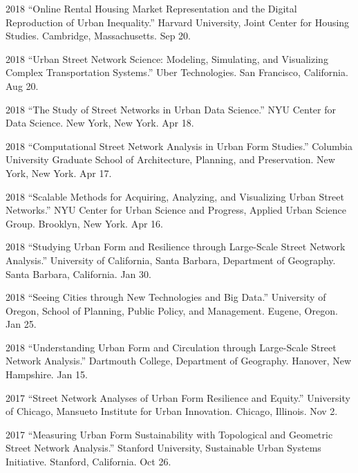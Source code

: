 \documentclass[12pt,letterpaper]{report}
\begin{document}
\begin{tablist}
	
\item[2018] \tab \enquote{Online Rental Housing Market Representation and the Digital Reproduction of Urban Inequality.} Harvard University, Joint Center for Housing Studies. Cambridge, Massachusetts. Sep 20.

\item[2018] \tab \enquote{Urban Street Network Science: Modeling, Simulating, and Visualizing Complex Transportation Systems.} Uber Technologies. San Francisco, California. Aug 20.

\item[2018] \tab \enquote{The Study of Street Networks in Urban Data Science.} NYU Center for Data Science. New York, New York. Apr 18.

\item[2018] \tab \enquote{Computational Street Network Analysis in Urban Form Studies.} Columbia University Graduate School of Architecture, Planning, and Preservation. New York, New York. Apr 17.

\item[2018] \tab \enquote{Scalable Methods for Acquiring, Analyzing, and Visualizing Urban Street Networks.} NYU Center for Urban Science and Progress, Applied Urban Science Group. Brooklyn, New York. Apr 16.

\item[2018] \tab \enquote{Studying Urban Form and Resilience through Large-Scale Street Network Analysis.} University of California, Santa Barbara, Department of Geography. Santa Barbara, California. Jan 30.

\item[2018] \tab \enquote{Seeing Cities through New Technologies and Big Data.} University of Oregon, School of Planning, Public Policy, and Management. Eugene, Oregon. Jan 25.

\item[2018] \tab \enquote{Understanding Urban Form and Circulation through Large-Scale Street Network Analysis.} Dartmouth College, Department of Geography. Hanover, New Hampshire. Jan 15.

\item[2017] \tab \enquote{Street Network Analyses of Urban Form Resilience and Equity.} University of Chicago, Mansueto Institute for Urban Innovation. Chicago, Illinois. Nov 2.

\item[2017] \tab \enquote{Measuring Urban Form Sustainability with Topological and Geometric Street Network Analysis.} Stanford University, Sustainable Urban Systems Initiative. Stanford, California. Oct 26.


\end{tablist}
\end{document}
